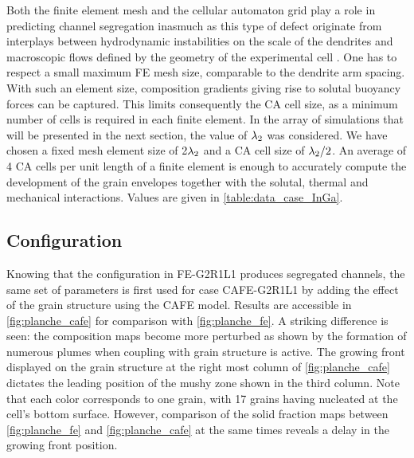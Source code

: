 Both the finite element mesh and the cellular automaton grid play a role in predicting channel segregation inasmuch as 
this type of defect originate from interplays between hydrodynamic instabilities on the scale of the dendrites 
and macroscopic flows defined by the geometry of the experimental cell \citep{shevchenko_chimney_2013}. One has to 
respect a small maximum FE mesh size, comparable to the dendrite arm spacing. With such an element size, composition gradients giving 
rise to solutal buoyancy forces can be captured. This limits consequently the CA cell size, as a minimum number 
of cells is required in each finite element. In the array of simulations that will be presented in the next section, 
the value of ${\lambda}_{2}$ was considered. We have chosen a fixed mesh element size of 2${\lambda}_{2}$ and a CA cell size of ${\lambda}_{2}/2$. 
An average of 4 CA cells per unit length of a finite element is enough to accurately compute the development of the 
grain envelopes together with the solutal, thermal and mechanical interactions. Values are given in \cref{table:data_case_InGa}.

\subsection{Configuration}

Knowing that the configuration in FE-G2R1L1 produces segregated channels, the same set of parameters is first used 
for case CAFE-G2R1L1 by adding the effect of the grain structure using the CAFE model. Results are accessible 
in \cref{fig:planche_cafe} for comparison with \cref{fig:planche_fe}. A striking difference is seen: the composition maps become more 
perturbed as shown by the formation of numerous plumes when coupling with grain structure is active. The growing 
front displayed on the grain structure at the right most column of \cref{fig:planche_cafe} dictates the leading position of the 
mushy zone shown in the third column. Note that each color corresponds to one grain, with 17 grains having nucleated 
at the cell’s bottom surface. However, comparison of the solid fraction maps between \cref{fig:planche_fe} and \cref{fig:planche_cafe} at the same times reveals a delay in the growing front position. 

